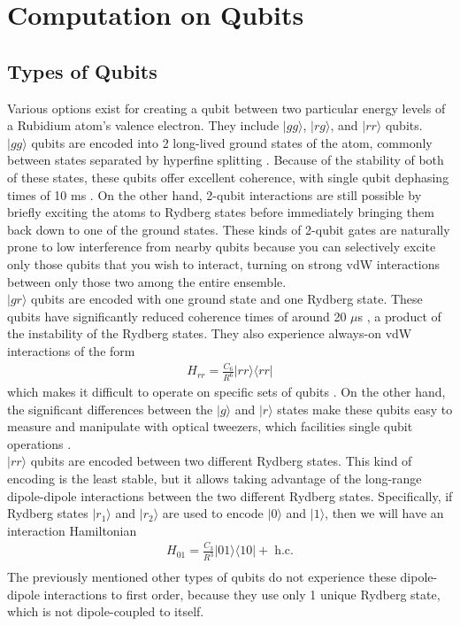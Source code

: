 \documentclass[aps,twocolumn,preprintnumbers]{revtex4}
\newcommand{\eq}{\begin{equation}\begin{aligned}}
\newcommand{\qe}{\end{aligned}\end{equation}}
\newcommand{\bra}[1]{\langle #1|}
\newcommand{\ket}[1]{|#1\rangle}
\begin{document}
\section{Computation on Qubits}

\subsection{Types of Qubits}

Various options exist for creating a qubit between two particular energy levels of a Rubidium atom's valence electron. They include $\ket{gg}$, $\ket{rg}$, and $\ket{rr}$ qubits.\\
$\ket{gg}$ qubits are encoded into 2 long-lived ground states of the atom, commonly between states separated by hyperfine splitting \cite{lukin}. Because of the stability of both of these states, these qubits offer excellent coherence, with single qubit dephasing times of 10 ms \cite{ground}. On the other hand, 2-qubit interactions are still possible by briefly exciting the atoms to Rydberg states before immediately bringing them back down to one of the ground states. These kinds of 2-qubit gates are naturally prone to low interference from nearby qubits because you can selectively excite only those qubits that you wish to interact, turning on strong vdW interactions between only those two among the entire ensemble.\\
$\ket{gr}$ qubits are encoded with one ground state and one Rydberg state. These qubits have significantly reduced coherence times of around 20 $\mu$s \cite{grqubits}, a product of the instability of the Rydberg states. They also experience always-on vdW interactions of the form
\eq
  H_{rr}=\frac{C_6}{R^6}\ket{rr}\bra{rr}
  \label{eq:blockade}
\qe
which makes it difficult to operate on specific sets of qubits \cite{gates}. On the other hand, the significant differences between the $\ket{g}$ and $\ket{r}$ states make these qubits easy to measure and manipulate with optical tweezers, which facilities single qubit operations \cite{grqubits}. \\
$\ket{rr}$ qubits are encoded between two different Rydberg states. This kind of encoding is the least stable, but it allows taking advantage of the long-range dipole-dipole interactions between the two different Rydberg states. Specifically, if Rydberg states $\ket{r_1}$ and $\ket{r_2}$ are used to encode $\ket{0}$ and $\ket{1}$, then we will have an interaction Hamiltonian
\eq
  H_{01}=\frac{C_3}{R^3}\ket{01}\bra{10}+\;\text{h.c.}\\
\qe
The previously mentioned other types of qubits do not experience these dipole-dipole interactions to first order, because they use only 1 unique Rydberg state, which is not dipole-coupled to itself.
\end{document}
